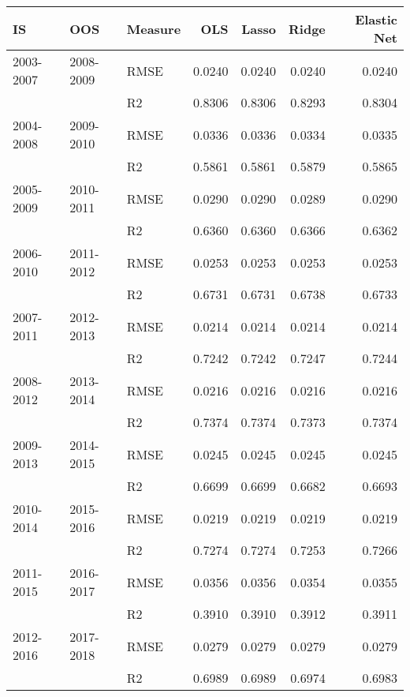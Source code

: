 \begin{tabular}{lllrrrr}
\toprule
        IS &        OOS & Measure &     OLS &   Lasso &   Ridge &  Elastic Net \\
\midrule
 2003-2007 &  2008-2009 &    RMSE &  0.0240 &  0.0240 &  0.0240 &       0.0240 \\
           &            &      R2 &  0.8306 &  0.8306 &  0.8293 &       0.8304 \\
 2004-2008 &  2009-2010 &    RMSE &  0.0336 &  0.0336 &  0.0334 &       0.0335 \\
           &            &      R2 &  0.5861 &  0.5861 &  0.5879 &       0.5865 \\
 2005-2009 &  2010-2011 &    RMSE &  0.0290 &  0.0290 &  0.0289 &       0.0290 \\
           &            &      R2 &  0.6360 &  0.6360 &  0.6366 &       0.6362 \\
 2006-2010 &  2011-2012 &    RMSE &  0.0253 &  0.0253 &  0.0253 &       0.0253 \\
           &            &      R2 &  0.6731 &  0.6731 &  0.6738 &       0.6733 \\
 2007-2011 &  2012-2013 &    RMSE &  0.0214 &  0.0214 &  0.0214 &       0.0214 \\
           &            &      R2 &  0.7242 &  0.7242 &  0.7247 &       0.7244 \\
 2008-2012 &  2013-2014 &    RMSE &  0.0216 &  0.0216 &  0.0216 &       0.0216 \\
           &            &      R2 &  0.7374 &  0.7374 &  0.7373 &       0.7374 \\
 2009-2013 &  2014-2015 &    RMSE &  0.0245 &  0.0245 &  0.0245 &       0.0245 \\
           &            &      R2 &  0.6699 &  0.6699 &  0.6682 &       0.6693 \\
 2010-2014 &  2015-2016 &    RMSE &  0.0219 &  0.0219 &  0.0219 &       0.0219 \\
           &            &      R2 &  0.7274 &  0.7274 &  0.7253 &       0.7266 \\
 2011-2015 &  2016-2017 &    RMSE &  0.0356 &  0.0356 &  0.0354 &       0.0355 \\
           &            &      R2 &  0.3910 &  0.3910 &  0.3912 &       0.3911 \\
 2012-2016 &  2017-2018 &    RMSE &  0.0279 &  0.0279 &  0.0279 &       0.0279 \\
           &            &      R2 &  0.6989 &  0.6989 &  0.6974 &       0.6983 \\

\end{tabular}

